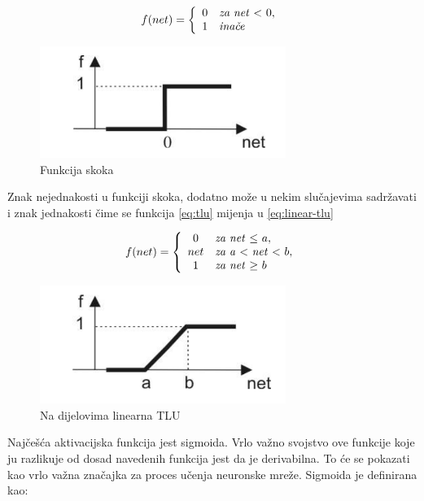 \begin{equation}
f(net)=\left\{
\begin{array}{c l}	
     0 & $\textit{za net} $ < $ $ 0,\\
     1 & $\textit{inače}$
\end{array}\right.
\label{eq:Funkcija skoka}
\end{equation}

\begin{figure}[H]
\centering
\includegraphics[width=8cm]{img/TLU.png}
\caption{Funkcija skoka}
\label{img:tlu}
\end{figure}

Znak nejednakosti u funkciji skoka, dodatno može u nekim slučajevima sadržavati i znak jednakosti čime se funkcija \ref{eq:tlu} mijenja u \ref{eq:linear-tlu}

\begin{equation}
f(net)=\left\{
\begin{array}{c l}	
     0   & $\textit{za net} $ \leq $ $ a,\\
     net & $\textit{za a} $ < $ \textit{net} $ < $ $ b,\\
     1   & $\textit{za net} $ \geq $ $ b
\end{array}\right.
\label{eq:Funkcija skoka koja je na dijelovima linearna}
\end{equation}

\begin{figure}[H]
\centering
\includegraphics[width=8cm]{img/LinearTLU.png}
\caption{Na dijelovima linearna TLU}
\label{img:linear-tlu}
\end{figure}

Najčešća aktivacijska funkcija jest sigmoida. Vrlo važno svojstvo ove funkcije koje ju razlikuje od dosad navedenih funkcija jest da je derivabilna. To će se pokazati kao vrlo važna značajka za proces učenja neuronske mreže. Sigmoida je definirana kao:

